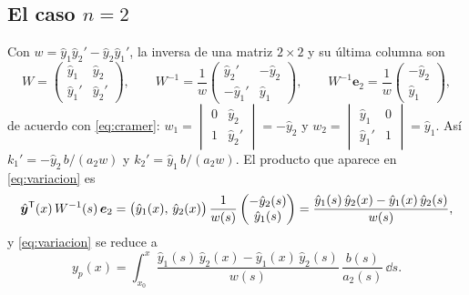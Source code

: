 \documentclass[11pt,twoside]{article}
\newcommand\yh{\hat y}
\newcommand\vyh{\hat{\bm y}}
\newcommand\ve{\bm e}
\newcommand\mat[1]{\begin{pmatrix}#1\end{pmatrix}}
\begin{document}
\subsection{El caso $n=2$}\label{sec:n2}

Con $w=\yh_1\yh_2'-\yh_2\yh_1'$, la inversa de una matriz $2\times2$ y su última columna son
\begin{equation*}
W=\mat{\yh_1&\yh_2\\ \yh_1'&\yh_2'},\qquad W^{-1}=\frac1w\mat{\yh_2'&-\yh_2\\-\yh_1'&\yh_1},\qquad
W^{-1}\ve_2=\frac1w\mat{-\yh_2\\ \yh_1},
\end{equation*}
de acuerdo con \eqref{eq:cramer}: $w_1=\begin{vmatrix}0&\yh_2\\1&\yh_2'\end{vmatrix}=-\yh_2$ y
$w_2=\begin{vmatrix}\yh_1&0\\ \yh_1'&1\end{vmatrix}=\yh_1$. Así $k_1'=-\yh_2\,b/(a_2w)$ y $k_2'=\yh_1\,b/(a_2w)$. El producto
que aparece en \eqref{eq:variacion} es
\begin{equation*}
\vyh\T(x)\,W^{-1}(s)\,\ve_2=\big(\yh_1(x),\,\yh_2(x)\big)\,\frac{1}{w(s)}\mat{-\yh_2(s)\\ \yh_1(s)}
=\frac{\yh_1(s)\,\yh_2(x)-\yh_1(x)\,\yh_2(s)}{w(s)},
\end{equation*}
y \eqref{eq:variacion} se reduce a
\begin{equation}\label{eq:n2}
y_p(x)=\int_{x_0}^{x}\frac{\yh_1(s)\,\yh_2(x)-\yh_1(x)\,\yh_2(s)}{w(s)}\,\frac{b(s)}{a_2(s)}\,\dd s.
\end{equation}
\end{document}
